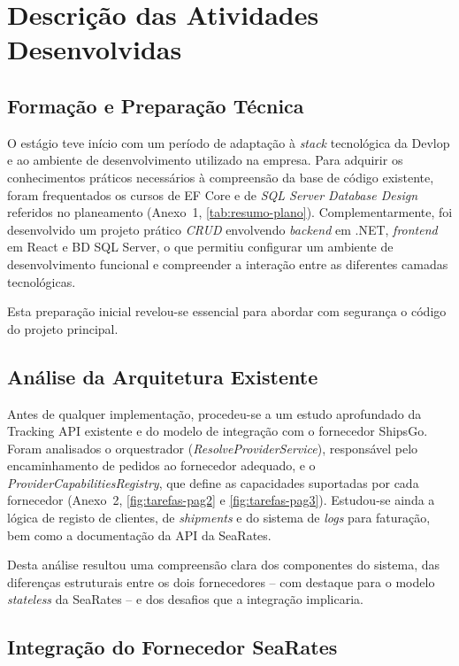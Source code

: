 \documentclass[a4paper,12pt]{report}
\begin{document}
\chapter{Descrição das Atividades Desenvolvidas}

\section{Formação e Preparação Técnica}

O estágio teve início com um período de adaptação à \textit{stack} tecnológica da Devlop e ao ambiente de desenvolvimento utilizado na empresa. Para adquirir os conhecimentos práticos necessários à compreensão da base de código existente, foram frequentados os cursos de EF Core e de \textit{SQL Server Database Design} referidos no planeamento (Anexo~1, \autoref{tab:resumo-plano}). Complementarmente, foi desenvolvido um projeto prático \textit{CRUD} envolvendo \textit{backend} em .NET, \textit{frontend} em React e BD SQL Server, o que permitiu configurar um ambiente de desenvolvimento funcional e compreender a interação entre as diferentes camadas tecnológicas.

Esta preparação inicial revelou-se essencial para abordar com segurança o código do projeto principal.

\section{Análise da Arquitetura Existente}

Antes de qualquer implementação, procedeu-se a um estudo aprofundado da Tracking API existente e do modelo de integração com o fornecedor ShipsGo. Foram analisados o orquestrador (\textit{ResolveProviderService}), responsável pelo encaminhamento de pedidos ao fornecedor adequado, e o \textit{ProviderCapabilitiesRegistry}, que define as capacidades suportadas por cada fornecedor (Anexo~2, \autoref{fig:tarefas-pag2} e \autoref{fig:tarefas-pag3}). Estudou-se ainda a lógica de registo de clientes, de \textit{shipments} e do sistema de \textit{logs} para faturação, bem como a documentação da API da SeaRates.

Desta análise resultou uma compreensão clara dos componentes do sistema, das diferenças estruturais entre os dois fornecedores -- com destaque para o modelo \textit{stateless} da SeaRates -- e dos desafios que a integração implicaria.

\section{Integração do Fornecedor SeaRates}
\end{document}
